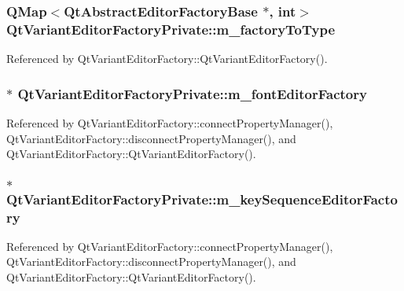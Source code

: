\subsubsection[{m\+\_\+factory\+To\+Type}]{\setlength{\rightskip}{0pt plus 5cm}Q\+Map$<${\bf Qt\+Abstract\+Editor\+Factory\+Base} $\ast$, int$>$ Qt\+Variant\+Editor\+Factory\+Private\+::m\+\_\+factory\+To\+Type}\label{classQtVariantEditorFactoryPrivate_abc2812c69d8858e51bf07a691de645de}


Referenced by Qt\+Variant\+Editor\+Factory\+::\+Qt\+Variant\+Editor\+Factory().

\subsubsection[{m\+\_\+font\+Editor\+Factory}]{$\ast$ Qt\+Variant\+Editor\+Factory\+Private\+::m\+\_\+font\+Editor\+Factory}\label{classQtVariantEditorFactoryPrivate_a690c15903e9deb72fda157b8c693874e}


Referenced by Qt\+Variant\+Editor\+Factory\+::connect\+Property\+Manager(), Qt\+Variant\+Editor\+Factory\+::disconnect\+Property\+Manager(), and Qt\+Variant\+Editor\+Factory\+::\+Qt\+Variant\+Editor\+Factory().

\subsubsection[{m\+\_\+key\+Sequence\+Editor\+Factory}]{$\ast$ Qt\+Variant\+Editor\+Factory\+Private\+::m\+\_\+key\+Sequence\+Editor\+Factory}\label{classQtVariantEditorFactoryPrivate_aab06d6eeaf65520b2c528d6ba6fe1b04}


Referenced by Qt\+Variant\+Editor\+Factory\+::connect\+Property\+Manager(), Qt\+Variant\+Editor\+Factory\+::disconnect\+Property\+Manager(), and Qt\+Variant\+Editor\+Factory\+::\+Qt\+Variant\+Editor\+Factory().

